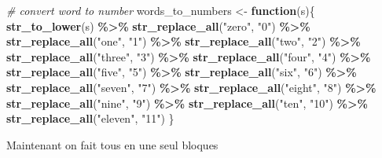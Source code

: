 \documentclass[
]{article}
\newenvironment{Shaded}{\begin{snugshade}}{\end{snugshade}}
\newcommand{\CommentTok}[1]{\textcolor[rgb]{0.56,0.35,0.01}{\textit{#1}}}
\newcommand{\ControlFlowTok}[1]{\textcolor[rgb]{0.13,0.29,0.53}{\textbf{#1}}}
\newcommand{\FunctionTok}[1]{\textcolor[rgb]{0.13,0.29,0.53}{\textbf{#1}}}
\newcommand{\NormalTok}[1]{#1}
\newcommand{\OtherTok}[1]{\textcolor[rgb]{0.56,0.35,0.01}{#1}}
\newcommand{\SpecialCharTok}[1]{\textcolor[rgb]{0.81,0.36,0.00}{\textbf{#1}}}
\newcommand{\StringTok}[1]{\textcolor[rgb]{0.31,0.60,0.02}{#1}}
\begin{document}
\begin{Shaded}
\begin{Highlighting}[]
\CommentTok{\# convert word to number}
\NormalTok{words\_to\_numbers }\OtherTok{\textless{}{-}} \ControlFlowTok{function}\NormalTok{(s)\{ }\FunctionTok{str\_to\_lower}\NormalTok{(s) }\SpecialCharTok{\%\textgreater{}\%}
    \FunctionTok{str\_replace\_all}\NormalTok{(}\StringTok{"zero"}\NormalTok{, }\StringTok{"0"}\NormalTok{) }\SpecialCharTok{\%\textgreater{}\%}
    \FunctionTok{str\_replace\_all}\NormalTok{(}\StringTok{"one"}\NormalTok{, }\StringTok{"1"}\NormalTok{) }\SpecialCharTok{\%\textgreater{}\%} 
    \FunctionTok{str\_replace\_all}\NormalTok{(}\StringTok{"two"}\NormalTok{, }\StringTok{"2"}\NormalTok{) }\SpecialCharTok{\%\textgreater{}\%}
    \FunctionTok{str\_replace\_all}\NormalTok{(}\StringTok{"three"}\NormalTok{, }\StringTok{"3"}\NormalTok{) }\SpecialCharTok{\%\textgreater{}\%}
    \FunctionTok{str\_replace\_all}\NormalTok{(}\StringTok{"four"}\NormalTok{, }\StringTok{"4"}\NormalTok{) }\SpecialCharTok{\%\textgreater{}\%} 
    \FunctionTok{str\_replace\_all}\NormalTok{(}\StringTok{"five"}\NormalTok{, }\StringTok{"5"}\NormalTok{) }\SpecialCharTok{\%\textgreater{}\%} 
    \FunctionTok{str\_replace\_all}\NormalTok{(}\StringTok{"six"}\NormalTok{, }\StringTok{"6"}\NormalTok{) }\SpecialCharTok{\%\textgreater{}\%} 
    \FunctionTok{str\_replace\_all}\NormalTok{(}\StringTok{"seven"}\NormalTok{, }\StringTok{"7"}\NormalTok{) }\SpecialCharTok{\%\textgreater{}\%} 
    \FunctionTok{str\_replace\_all}\NormalTok{(}\StringTok{"eight"}\NormalTok{, }\StringTok{"8"}\NormalTok{) }\SpecialCharTok{\%\textgreater{}\%}
    \FunctionTok{str\_replace\_all}\NormalTok{(}\StringTok{"nine"}\NormalTok{, }\StringTok{"9"}\NormalTok{) }\SpecialCharTok{\%\textgreater{}\%}
    \FunctionTok{str\_replace\_all}\NormalTok{(}\StringTok{"ten"}\NormalTok{, }\StringTok{"10"}\NormalTok{) }\SpecialCharTok{\%\textgreater{}\%} 
    \FunctionTok{str\_replace\_all}\NormalTok{(}\StringTok{"eleven"}\NormalTok{, }\StringTok{"11"}\NormalTok{)}
\NormalTok{\}}
\end{Highlighting}
\end{Shaded}

Maintenant on fait tous en une seul bloques
\end{document}
